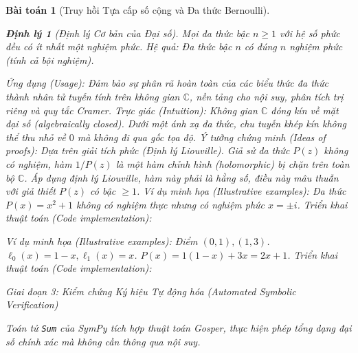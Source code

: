 \documentclass{article}
\newtheorem{baitoan}{Bài toán}
\newtheorem{dinhly}{Định lý}
\begin{document}
\begin{baitoan}[Truy hồi Tựa cấp số cộng và Đa thức Bernoulli]
\begin{dinhly}[Định lý Cơ bản của Đại số]
Mọi đa thức bậc $n \ge 1$ với hệ số phức đều có ít nhất một nghiệm phức. Hệ quả: Đa thức bậc $n$ có đúng $n$ nghiệm phức (tính cả bội nghiệm).
\end{dinhly}
\emph{Ứng dụng (Usage):} Đảm bảo sự phân rã hoàn toàn của các biểu thức đa thức thành nhân tử tuyến tính trên không gian $\mathbb{C}$, nền tảng cho nội suy, phân tích trị riêng và quy tắc Cramer.
\emph{Trực giác (Intuition):} Không gian $\mathbb{C}$ đóng kín về mặt đại số (algebraically closed). Dưới một ánh xạ đa thức, chu tuyến khép kín không thể thu nhỏ về $0$ mà không đi qua gốc tọa độ.
\emph{Ý tưởng chứng minh (Ideas of proofs):} Dựa trên giải tích phức (Định lý Liouville). Giả sử đa thức $P(z)$ không có nghiệm, hàm $1/P(z)$ là một hàm chỉnh hình (holomorphic) bị chặn trên toàn bộ $\mathbb{C}$. Áp dụng định lý Liouville, hàm này phải là hằng số, điều này mâu thuẫn với giả thiết $P(z)$ có bậc $\ge 1$.
\emph{Ví dụ minh họa (Illustrative examples):} Đa thức $P(x) = x^2 + 1$ không có nghiệm thực nhưng có nghiệm phức $x = \pm i$.
\emph{Triển khai thuật toán (Code implementation):}


\emph{Ví dụ minh họa (Illustrative examples):} Điểm $(0, 1), (1, 3)$. $\ell_0(x) = 1-x, \ell_1(x) = x$. $P(x) = 1(1-x) + 3x = 2x+1$.
\emph{Triển khai thuật toán (Code implementation):}





\vspace{0.5em}\noindent\emph{Giai đoạn 3: Kiểm chứng Ký hiệu Tự động hóa (Automated Symbolic Verification)}
 
 Toán tử \texttt{Sum} của \textsf{SymPy} tích hợp thuật toán Gosper, thực hiện phép tổng dạng đại số chính xác mà không cần thông qua nội suy.




\end{baitoan}
\end{document}
